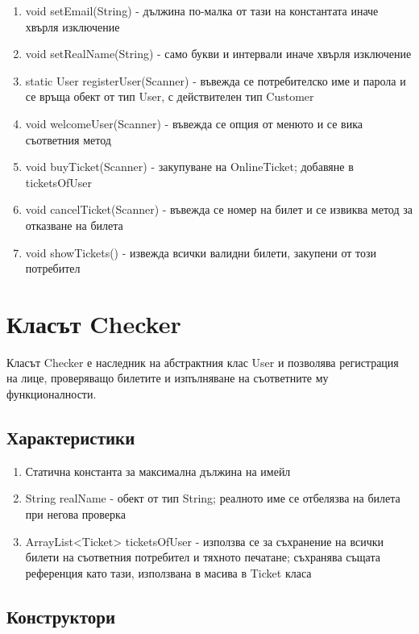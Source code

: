 \documentclass[12pt]{article}
\begin{document}
        \begin{enumerate}
            \item void setEmail(String) - дължина по-малка от тази на константата иначе хвърля изключение
            \item void setRealName(String) - само букви и интервали иначе хвърля изключение
            \item static User registerUser(Scanner) - въвежда се потребителско име и парола и се връща обект от тип User, с действителен тип Customer
            \item void welcomeUser(Scanner) - въвежда се опция от менюто и се вика съответния метод
            \item void buyTicket(Scanner) - закупуване на OnlineTicket; добавяне в ticketsOfUser
            \item void cancelTicket(Scanner) - въвежда се номер на билет и се извиква метод за отказване на билета
            \item void showTickets() - извежда всички валидни билети, закупени от този потребител
        \end{enumerate}

\section{Класът Checker}

    Класът Checker е наследник на абстрактния клас User и позволява регистрация на лице, проверяващо билетите и изпълняване на съответните му функционалности.

    \subsection{Характеристики}

        \begin{enumerate}
            \item Статична константа за максимална дължина на имейл
            \item String realName - обект от тип String; реалното име се отбелязва на билета при негова проверка
            \item ArrayList<Ticket> ticketsOfUser - използва се за съхранение на всички билети на съответния потребител и тяхното печатане; съхранява същата референция като тази, използвана в масива в Ticket класа
        \end{enumerate}

    \subsection{Конструктори}
\end{document}

